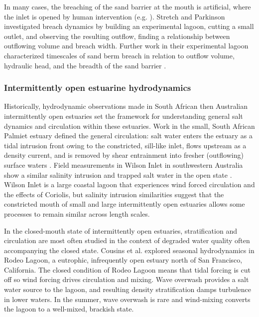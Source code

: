 In many cases, the breaching of the sand barrier at the mouth is artificial, where the inlet is opened by human intervention (e.g. \cite{fortunato_morphological_2014, behrens_episodic_2013}). Stretch and Parkinson \parencite*{stretch_breaching_2006} investigated breach dynamics by building an experimental lagoon, cutting a small outlet, and observing the resulting outflow, finding a relationship between outflowing volume and breach width. Further work in their experimental lagoon characterized timescales of sand berm breach in relation to outflow volume, hydraulic head, and the breadth of the sand barrier \parencite{parkinson_breaching_2007}. 


\subsubsection{Intermittently open estuarine hydrodynamics}

Historically, hydrodynamic observations made in South African then Australian intermittently open estuaries set the framework for understanding general salt dynamics and circulation within these estuaries. Work in the small, South African Palmiet estuary defined the general circulation: salt water enters the estuary as a tidal intrusion front owing to the constricted, sill-like inlet, flows upstream as a density current, and is removed by shear entrainment into fresher (outflowing) surface waters \parencite{largier_stratified_1992}. Field measurements in Wilson Inlet in southwestern Australia show a similar salinity intrusion and trapped salt water in the open state \parencite{ranasinghe_circulation_1999}. Wilson Inlet is a large coastal lagoon that experiences wind forced circulation and the effects of Coriolis, but salinity intrusion similarities suggest that the constricted mouth of small and large intermittently open estuaries allows some processes to remain similar across length scales. 


In the closed-mouth state of intermittently open estuaries, stratification and circulation are most often studied in the context of degraded water quality often accompanying the closed state. Cousins et al. \parencite*{cousins_effects_2010} explored seasonal hydrodynamics in Rodeo Lagoon, a eutrophic, infrequently open estuary north of San Francisco, California. The closed condition of Rodeo Lagoon means that tidal forcing is cut off so wind forcing drives circulation and mixing. Wave overwash provides a salt water source to the lagoon, and resulting density stratification damps turbulence in lower waters. In the summer, wave overwash is rare and wind-mixing converts the lagoon to a well-mixed, brackish state.

